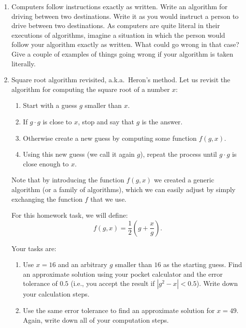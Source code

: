 \documentclass[a4paper,10pt]{article}
\begin{document}
\begin{enumerate}

  \item Computers follow instructions exactly as written. Write an algorithm for driving between two destinations. Write it as you would instruct a person to drive between two destinations. As computers are quite literal in their executions of algorithms, imagine a situation in which the person would follow your algorithm exactly as written. What could go wrong in that case? Give a couple of examples of things going wrong if your algorithm is taken literally.

\newpage
\mbox{} 

\newpage
\mbox{} 

  \item Square root algorithm revisited, a.k.a.\ Heron’s method. Let us revisit the algorithm for computing the square root of a number $x$:

  \begin{enumerate}
    \item Start with a guess $g$ smaller than $x$.
    \item If $g \cdot g$ is close to $x$, stop and say that $g$ is the answer.
    \item Otherwise create a new guess by computing some function $f(g, x)$.
    \item Using this new guess (we call it again $g$), repeat the process until $g \cdot g$ is close enough to $x$.
  \end{enumerate}

  Note that by introducing the function $f(g, x)$ we created a generic algorithm (or a family of algorithms), which we can easily adjust by simply exchanging the function $f$ that we use.

  For this homework task, we will define:
  \[
    f(g, x) = \frac{1}{2} \left( g + \frac{x}{g} \right).
  \]

  Your tasks are:
  \begin{enumerate}
    \item Use $x = 16$ and an arbitrary $g$ smaller than $16$ as the starting guess. Find an approximate solution using your pocket calculator and the error tolerance of $0.5$ (i.e., you accept the result if $|g^2 - x| < 0.5$). Write down your calculation steps.

    \item Use the same error tolerance to find an approximate solution for $x = 49$. Again, write down all of your computation steps.


\end{enumerate}
\end{enumerate}
\end{document}
